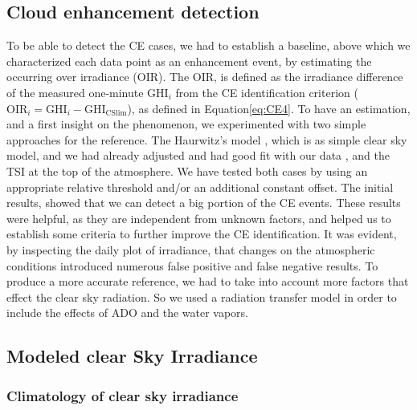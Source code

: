 \documentclass[preprint, 5p,
authoryear]{elsarticle} %
\begin{document}
\hypertarget{cloud-enhancement-detection}{%
\subsection{Cloud enhancement
detection}\label{cloud-enhancement-detection}}

To be able to detect the CE cases, we had to establish a baseline, above
which we characterized each data point as an enhancement event, by
estimating the occurring over irradiance (OIR). The OIR, is defined as
the irradiance difference of the measured one-minute \(\text{GHI}_i\)
from the CE identification criterion
(\(\text{OIR}_i = \text{GHI}_i - \text{GHI}_\text{CSlim}\)), as defined
in Equation\nobreakspace\ref{eq:CE4}. To have an estimation, and a first
insight on the phenomenon, we experimented with two simple approaches
for the reference. The Haurwitz's model \citep{Haurwitz1945}, which is
as simple clear sky model, and we had already adjusted and had good fit
with our data \citep{Natsis2023}, and the TSI at the top of the
atmosphere. We have tested both cases by using an appropriate relative
threshold and/or an additional constant offset. The initial results,
showed that we can detect a big portion of the CE events. These results
were helpful, as they are independent from unknown factors, and helped
us to establish some criteria to further improve the CE identification.
It was evident, by inspecting the daily plot of irradiance, that changes
on the atmospheric conditions introduced numerous false positive and
false negative results. To produce a more accurate reference, we had to
take into account more factors that effect the clear sky radiation. So
we used a radiation transfer model in order to include the effects of
ADO and the water vapors.

\hypertarget{modeled-clear-sky-irradiance}{%
\subsection{Modeled clear Sky
Irradiance}\label{modeled-clear-sky-irradiance}}

\hypertarget{climatology-of-clear-sky-irradiance}{%
\subsubsection{Climatology of clear sky
irradiance}\label{climatology-of-clear-sky-irradiance}}
\end{document}
